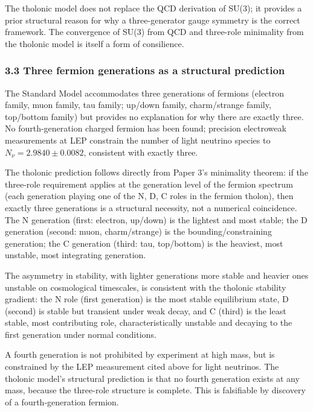 \documentclass[
  11pt,
  letterpaper,
]{article}
\begin{document}
The tholonic model does not replace the QCD derivation of SU(3); it
provides a prior structural reason for why a three-generator gauge
symmetry is the correct framework. The convergence of SU(3) from QCD and
three-role minimality from the tholonic model is itself a form of
consilience.

\subsubsection{3.3 Three fermion generations as a structural
prediction}\label{three-fermion-generations-as-a-structural-prediction}

The Standard Model accommodates three generations of fermions (electron
family, muon family, tau family; up/down family, charm/strange family,
top/bottom family) but provides no explanation for why there are exactly
three. No fourth-generation charged fermion has been found; precision
electroweak measurements at LEP constrain the number of light neutrino
species to \(N_\nu = 2.9840 \pm 0.0082\), consistent with exactly three.

The tholonic prediction follows directly from Paper 3's minimality
theorem: if the three-role requirement applies at the generation level
of the fermion spectrum (each generation playing one of the N, D, C
roles in the fermion tholon), then exactly three generations is a
structural necessity, not a numerical coincidence. The N generation
(first: electron, up/down) is the lightest and most stable; the D
generation (second: muon, charm/strange) is the bounding/constraining
generation; the C generation (third: tau, top/bottom) is the heaviest,
most unstable, most integrating generation.

The asymmetry in stability, with lighter generations more stable and
heavier ones unstable on cosmological timescales, is consistent with the
tholonic stability gradient: the N role (first generation) is the most
stable equilibrium state, D (second) is stable but transient under weak
decay, and C (third) is the least stable, most contributing role,
characteristically unstable and decaying to the first generation under
normal conditions.

A fourth generation is not prohibited by experiment at high mass, but is
constrained by the LEP measurement cited above for light neutrinos. The
tholonic model's structural prediction is that no fourth generation
exists at any mass, because the three-role structure is complete. This
is falsifiable by discovery of a fourth-generation fermion.
\end{document}
